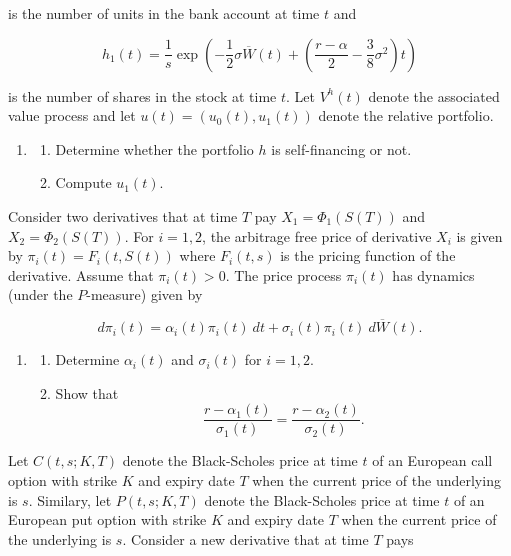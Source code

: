 \documentclass[
]{article}
\providecommand{\tightlist}{%
  \setlength{\itemsep}{0pt}\setlength{\parskip}{0pt}}
\begin{document}
is the number of units in the bank account at time \(t\) and

\[
h_1(t)=\frac{1}{s}\exp\left(-\frac{1}{2}\sigma\overline{W}(t)+\left(\frac{r-\alpha}{2}-\frac{3}{8}\sigma^2\right)t\right)
\]

is the number of shares in the stock at time \(t\). Let \(V^h(t)\)
denote the associated value process and let
\(u(t)=\left(u_0(t),u_1(t)\right)\) denote the relative portfolio.

\begin{enumerate}
\def\labelenumi{\alph{enumi}.}
\item
  \begin{enumerate}
  \def\labelenumii{\roman{enumii}.}
  \tightlist
  \item
    Determine whether the portfolio \(h\) is self-financing or not.
  \item
    Compute \(u_1(t)\).
  \end{enumerate}
\end{enumerate}

Consider two derivatives that at time \(T\) pay \(X_1=\Phi_1(S(T))\) and
\(X_2=\Phi_2(S(T))\). For \(i=1,2\), the arbitrage free price of
derivative \(X_i\) is given by \(\pi_i(t)=F_i(t,S(t))\) where
\(F_i(t,s)\) is the pricing function of the derivative. Assume that
\(\pi_i(t)>0\). The price process \(\pi_i(t)\) has dynamics (under the
\(P\)-measure) given by

\[
d\pi_i(t)=\alpha_i(t)\pi_i(t)\ dt+\sigma_i(t)\pi_i(t)\ d\overline{W}(t).
\]

\begin{enumerate}
\def\labelenumi{\alph{enumi}.}
\setcounter{enumi}{1}
\item
  \begin{enumerate}
  \def\labelenumii{\roman{enumii}.}
  \tightlist
  \item
    Determine \(\alpha_i(t)\) and \(\sigma_i(t)\) for \(i=1,2\).
  \item
    Show that \[
    \frac{r-\alpha_1(t)}{\sigma_1(t)}=\frac{r-\alpha_2(t)}{\sigma_2(t)}.
    \]
  \end{enumerate}
\end{enumerate}

Let \(C(t,s;K,T)\) denote the Black-Scholes price at time \(t\) of an
European call option with strike \(K\) and expiry date \(T\) when the
current price of the underlying is \(s\). Similary, let \(P(t,s;K,T)\)
denote the Black-Scholes price at time \(t\) of an European put option
with strike \(K\) and expiry date \(T\) when the current price of the
underlying is \(s\). Consider a new derivative that at time \(T\) pays
\end{document}

